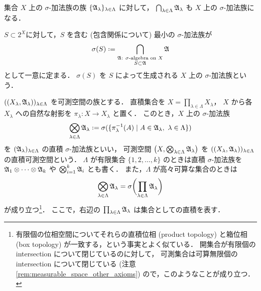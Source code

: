 \begin{example}
    集合 $X$ 上の $\sigma$-加法族の族 $\{\mathfrak{A}_\lambda\}_{\lambda\in\Lambda}$ に対して，
        $\bigcap_{\lambda\in\Lambda}\mathfrak{A}_\lambda$
    も $X$ 上の $\sigma$-加法族になる．

    $S\subset 2^X$に対して，$S$ を含む (包含関係について) 最小の $\sigma$-加法族が
    \begin{align*}
        \sigma(S)\defeq\bigcap_{\substack{\text{$\Afrak$: $\sigma$-algebra on $X$}\\S\subset\Afrak}}\Afrak
    \end{align*}
    として一意に定まる．
    $\sigma(S)$ を $S$ によって生成される $X$ 上の $\sigma$-加法族という．
\end{example}

\begin{example}\label{ex:product_sigma_algebra}
    $((X_\lambda,\mathfrak{A}_\lambda))_{\lambda\in\Lambda}$ を可測空間の族とする．
    直積集合を $X=\prod_{\lambda\in\Lambda}X_\lambda$，
    $X$ から各 $X_\lambda$ への自然な射影を $\pi_\lambda:X\to X_\lambda$ と置く．
    このとき，$X$ 上の $\sigma$-加法族
    \begin{align*}
        \bigotimes_{\lambda\in\Lambda}\Afrak_\lambda
        \defeq\sigma(\{\pi_\lambda^{-1}(A)\mid A\in\Afrak_\lambda,\ \lambda\in\Lambda\})
    \end{align*}
    を $(\mathfrak{A}_\lambda)_{\lambda\in\Lambda}$ の直積 $\sigma$-加法族といい，
    可測空間 $\left(X,\bigotimes_{\lambda\in\Lambda}\mathfrak{A}_\lambda\right)$ を
    $((X_\lambda,\mathfrak{A}_\lambda))_{\lambda\in\Lambda}$ の直積可測空間という．
    $\Lambda$ が有限集合 $\{1,2,\ldots,k\}$ のときは直積 $\sigma$-加法族を
    $\mathfrak{A}_1\otimes\cdots\otimes\mathfrak{A}_k$ や $\bigotimes_{i=1}^k\mathfrak{A}_i$ とも書く．
    また，$\Lambda$ が高々可算な集合のときは
    \begin{align*}
        \bigotimes_{\lambda\in\Lambda}\mathfrak{A}_\lambda
        =\sigma\biggl(\prod_{\lambda\in\Lambda}\mathfrak{A}_\lambda\biggr)
    \end{align*}
    が成り立つ\footnote{
        有限個の位相空間についてそれらの直積位相 (product topology) と箱位相 (box topology) が一致する，という事実とよく似ている．
        開集合が有限個の intersection について閉じているのに対して，
        可測集合は可算無限個の intersection について閉じている (注意 \ref{rem:measurable_space_other_axioms})
        ので，このようなことが成り立つ．
    }．
    ここで，右辺の $\prod_{\lambda\in\Lambda}\mathfrak{A}_\lambda$ は集合としての直積を表す．
\end{example}

